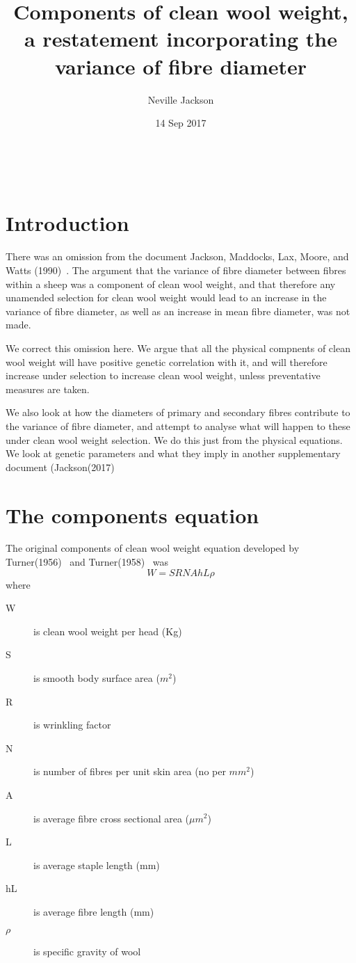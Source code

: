 \documentclass[titlepage]{article}  %
\title{Components of clean wool weight, a restatement incorporating the variance of fibre diameter}
\author{Neville Jackson}
\date{14 Sep 2017}
\begin{document}
 


 
\maketitle      
\tableofcontents

$\newcommand{\E}{\mathrm{E}}$
$\newcommand{\Var}{\mathrm{Var}}$
$\newcommand{\Cov}{\mathrm{Cov}}$ 
$\newcommand{\SD}{\mathrm{SD}}$ 

\clearpage
\section{Introduction} 
There was an omission from the document Jackson, Maddocks, Lax, Moore, and Watts (1990)~\cite{jack:90}. The argument that the variance of fibre diameter between fibres within a sheep was a component of clean wool weight, and that therefore any unamended selection for clean wool weight would lead to an increase in the variance of fibre diameter, as well as an increase in mean fibre diameter, was not made. 

We correct this omission here. We argue that all the physical compnents of clean wool weight will have positive genetic correlation with it, and will therefore increase under selection to increase clean wool weight, unless preventative measures are taken.

We also look at how the diameters of primary and secondary fibres contribute to the variance of fibre diameter, and attempt to analyse what will happen to these under clean wool weight selection. We do this just from the physical equations. We look at genetic parameters and what they imply in another supplementary document (Jackson(2017)~\cite{jack:17}

\section{The components equation}
The original components of clean wool weight equation developed by Turner(1956)~\cite{turn:56} and Turner(1958)~\cite{turn:58} was
\begin{displaymath}
 W = S R N A hL \rho
\end{displaymath}
where
\begin{description}
\item[W] is clean wool weight per head (Kg)
\item[S] is smooth body surface area ($m^{2}$)
\item[R] is wrinkling factor
\item[N] is number of fibres per unit skin area (no per $mm^{2}$)
\item[A] is average fibre cross sectional area ($\mu m ^{2}$)
\item[L] is average staple length (mm)
\item[hL] is average fibre length (mm)
\item[$\rho$] is specific gravity of wool
\end{description}
\end{document}
